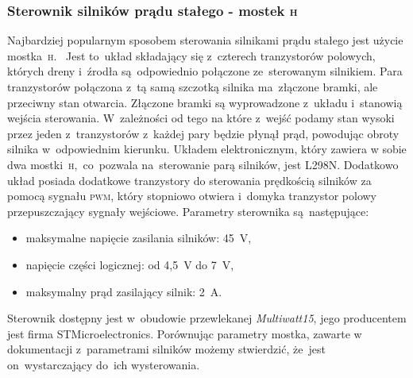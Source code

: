 \documentclass[11pt]{article}
\begin{document}
\subsubsection{Sterownik silników prądu stałego -  mostek \textsc{h}}
Najbardziej popularnym sposobem sterowania silnikami prądu stałego jest użycie mostka~\textsc{h}.
~Jest to~układ składający się z~czterech tranzystorów polowych, których dreny i~źrodła są~odpowiednio połączone ze~sterowanym silnikiem. Para tranzystorów połączona z~tą samą szczotką silnika ma~złączone bramki, ale przeciwny stan otwarcia.
Złączone bramki są wyprowadzone z~układu i~stanowią wejścia sterowania. W~zależności od tego na które z~wejść podamy stan wysoki przez jeden z~tranzystorów z~każdej pary będzie płynął prąd, powodując obroty silnika w~odpowiednim kierunku.
Układem elektronicznym, który zawiera w sobie dwa mostki~\textsc{h},~co~pozwala na~sterowanie parą silników, jest L298N.
Dodatkowo układ posiada dodatkowe tranzystory do sterowania prędkością silników za pomocą sygnału \textsc{pwm}, który stopniowo otwiera i~domyka tranzystor polowy przepuszczający sygnały wejściowe. Parametry sterownika są~następujące:
\begin{itemize}
	\item maksymalne napięcie zasilania silników: 45~\si{\volt},
	\item napięcie części logicznej: od 4,5~\si{\volt} do 7~\si{\volt},
	\item maksymalny prąd zasilający silnik: 2~\si{\ampere}.
\end{itemize}
Sterownik dostępny jest w~obudowie przewlekanej \textit{Multiwatt15}, jego producentem jest firma STMicroelectronics. Porównując parametry mostka, zawarte w dokumentacji \cite{h_bridge_datasheet} z~parametrami silników możemy stwierdzić, że~jest on~wystarczający do~ich wysterowania.
\end{document}
